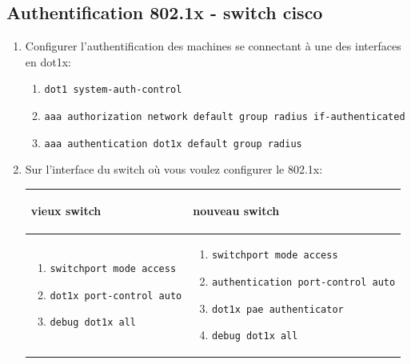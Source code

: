 \documentclass[a4paper]{article}
\begin{document}
\subsection{Authentification 802.1x - switch cisco}





\begin{enumerate}

\item Configurer l'authentification des machines se connectant à une des interfaces en dot1x:
\begin{enumerate}
    \item \texttt{dot1 system-auth-control}
    \item \texttt{aaa authorization network default group radius if-authenticated}
    \item \texttt{aaa authentication dot1x default group radius}
\end{enumerate}

\item Sur l'interface du switch où vous voulez configurer le 802.1x:
\begin{center} \begin{tabular}{|p{6.5cm}|p{7cm}|} \hline
    \begin{center} \textbf{vieux switch} \end{center} & \begin{center} \textbf{nouveau switch} \end{center} \\ \hline
    \begin{enumerate}
        \item \texttt{switchport mode access}
        \item \texttt{dot1x port-control auto}
        \item \texttt{debug dot1x all}
    \end{enumerate}
    &
    \begin{enumerate}
        \item \texttt{switchport mode access}
        \item \texttt{authentication port-control auto}
        \item \texttt{dot1x pae authenticator}
        \item \texttt{debug dot1x all}
    \end{enumerate} \\ \hline
\end{tabular} \end{center}

\end{enumerate}
\end{document}
